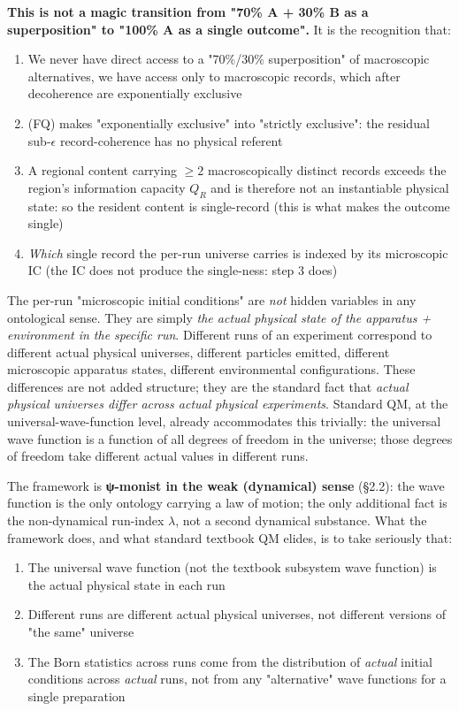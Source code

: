 \documentclass[11pt,a4paper]{article}
\begin{document}
\textbf{This is not a magic transition from "70\% A + 30\% B as a superposition" to "100\% A as a single outcome".} It is the recognition that:
\begin{enumerate}
  \item We never have direct access to a "70\%/30\% superposition" of macroscopic alternatives, we have access only to macroscopic records, which after decoherence are exponentially exclusive
  \item (FQ) makes "exponentially exclusive" into "strictly exclusive": the residual sub-$\epsilon$ record-coherence has no physical referent
  \item A regional content carrying $\ge 2$ macroscopically distinct records exceeds the region's information capacity $Q_R$ and is therefore not an instantiable physical state: so the resident content is single-record (this is what makes the outcome single)
  \item \emph{Which} single record the per-run universe carries is indexed by its microscopic IC (the IC does not produce the single-ness: step 3 does)
\end{enumerate}

The per-run "microscopic initial conditions" are \emph{not} hidden variables in any ontological sense. They are simply \emph{the actual physical state of the apparatus + environment in the specific run}. Different runs of an experiment correspond to different actual physical universes, different particles emitted, different microscopic apparatus states, different environmental configurations. These differences are not added structure; they are the standard fact that \emph{actual physical universes differ across actual physical experiments}. Standard QM, at the universal-wave-function level, already accommodates this trivially: the universal wave function is a function of all degrees of freedom in the universe; those degrees of freedom take different actual values in different runs.

The framework is \textbf{ψ-monist in the weak (dynamical) sense} (§2.2): the wave function is the only ontology carrying a law of motion; the only additional fact is the non-dynamical run-index $\lambda$, not a second dynamical substance. What the framework does, and what standard textbook QM elides, is to take seriously that:
\begin{enumerate}
  \item The universal wave function (not the textbook subsystem wave function) is the actual physical state in each run
  \item Different runs are different actual physical universes, not different versions of "the same" universe
  \item The Born statistics across runs come from the distribution of \emph{actual} initial conditions across \emph{actual} runs, not from any "alternative" wave functions for a single preparation
\end{enumerate}
\end{document}
